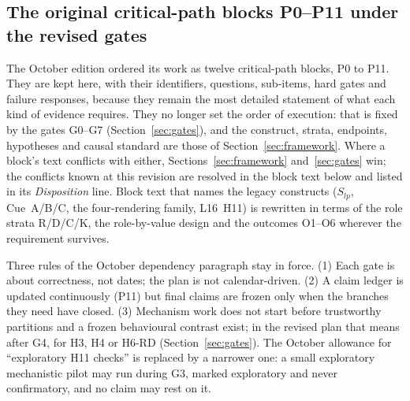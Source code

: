 \documentclass[10pt,a4paper]{article}
\begin{document}
\subsection{The original critical-path blocks P0--P11 under the revised gates}
\label{sec:blocks}

The October edition ordered its work as twelve critical-path blocks, P0 to P11. They are kept here, with their
identifiers, questions, sub-items, hard gates and failure responses, because they remain the most detailed
statement of what each kind of evidence requires. They no longer set the order of execution: that is fixed by the
gates G0--G7 (Section~\ref{sec:gates}), and the construct, strata, endpoints, hypotheses and causal standard are
those of Section~\ref{sec:framework}. Where a block's text conflicts with either, Sections~\ref{sec:framework}
and~\ref{sec:gates} win; the conflicts known at this revision are resolved in the block text below and listed in
its \emph{Disposition} line. Block text that names the legacy constructs ($S_{lp}$, Cue~A/B/C, the four-rendering
family, L16~H11) is rewritten in terms of the role strata R/D/C/K, the role-by-value design and the outcomes
O1--O6 wherever the requirement survives.

Three rules of the October dependency paragraph stay in force. (1) Each gate is about correctness, not dates; the
plan is not calendar-driven. (2) A claim ledger is updated continuously (P11) but final claims are frozen only when
the branches they need have closed. (3) Mechanism work does not start before trustworthy partitions and a frozen
behavioural contrast exist; in the revised plan that means after G4, for H3, H4 or H6-RD (Section~\ref{sec:gates}). The October
allowance for ``exploratory H11 checks'' is replaced by a narrower one: a small exploratory mechanistic pilot may
run during G3, marked exploratory and never confirmatory, and no claim may rest on it.
\end{document}
